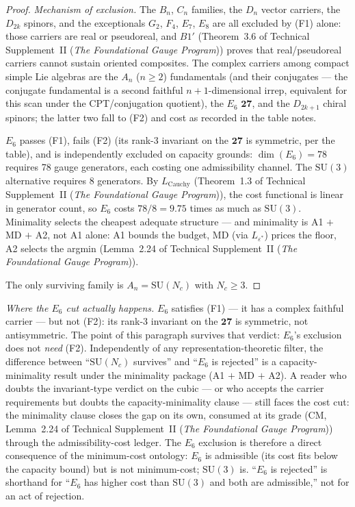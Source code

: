 \documentclass[11pt]{article}
\theoremstyle{definition}
\newcommand{\SU}{\mathrm{SU}}
\newcommand{\TSII}{Technical Supplement~II (\emph{The Foundational Gauge Program})}
\begin{document}
\begin{proof}
\medskip\noindent\textit{Mechanism of exclusion.}\quad
The $B_n$, $C_n$ families, the $D_n$ vector carriers, the $D_{2k}$
spinors, and the exceptionals $G_2$, $F_4$, $E_7$, $E_8$ are all
excluded by (F1) alone: those carriers are real or pseudoreal, and
$B1'$ (Theorem~3.6 of \TSII{}) proves that real/pseudoreal carriers
cannot sustain oriented composites.  The complex carriers among
compact simple Lie algebras are the $A_n$ ($n \ge 2$) fundamentals
(and their conjugates --- the conjugate fundamental is a second
faithful $n{+}1$-dimensional irrep, equivalent for this scan under the
CPT/conjugation quotient), the $E_6$ $\mathbf{27}$, and the
$D_{2k+1}$ chiral spinors; the latter two fall to (F2) and cost as
recorded in the table notes.

$E_6$ passes (F1), fails (F2) (its rank-3 invariant on the
$\mathbf{27}$ is symmetric, per the table), and is independently
excluded on capacity grounds:
$\dim(E_6) = 78$ requires 78 gauge generators, each costing one
admissibility channel.  The $\SU(3)$ alternative requires 8 generators.
By $L_{\mathrm{Cauchy}}$ (Theorem~1.3 of \TSII{}), the cost
functional is linear in generator count, so $E_6$ costs
$78/8 = 9.75$ times as much as $\SU(3)$.  Minimality selects the
cheapest adequate structure --- and minimality is A1 $+$ MD $+$ A2, not
A1 alone: A1 bounds the budget, MD (via $L_{\varepsilon^*}$) prices the
floor, A2 selects the argmin (Lemma~2.24 of \TSII{}).

The only surviving family is $A_n = \SU(N_c)$ with $N_c \ge 3$.
\end{proof}

\smallskip\noindent\textit{Where the $E_6$ cut actually happens.}\quad
$E_6$ satisfies (F1) --- it has a complex faithful carrier --- but not
(F2): its rank-3 invariant on the $\mathbf{27}$ is symmetric, not
antisymmetric.  The point of this paragraph survives that verdict:
$E_6$'s exclusion does not \emph{need} (F2).  Independently of any
representation-theoretic filter, the difference between ``$\SU(N_c)$
survives'' and
``$E_6$ is rejected'' is a
capacity-minimality result under the minimality package (A1 $+$ MD $+$
A2).  A reader who doubts the
invariant-type verdict on the cubic --- or who accepts the carrier
requirements but doubts the capacity-minimality clause --- still
faces the cost cut: the
minimality clause closes the gap on its own, consumed at its grade
(CM, Lemma~2.24 of \TSII{}) through the admissibility-cost ledger.  The $E_6$
exclusion is therefore a direct consequence of the minimum-cost
ontology: $E_6$ is admissible (its cost fits below the capacity bound)
but is not minimum-cost; $\SU(3)$ is.  ``$E_6$ is rejected'' is
shorthand for ``$E_6$ has higher cost than $\SU(3)$ and both are
admissible,'' not for an act of rejection.
\end{document}
